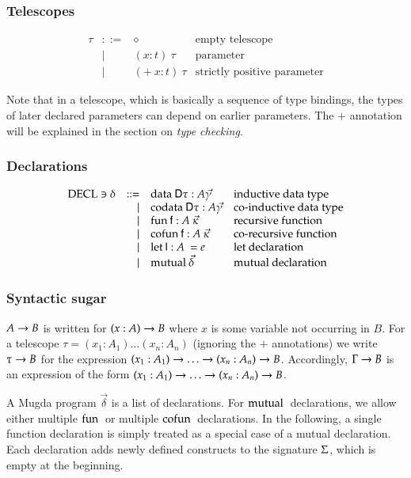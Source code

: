 \subsubsection{Telescopes}
\[
\begin{array}{lrll}
\tau & ::= & \diamond & \mbox{empty telescope}\\
& \mid & ( x : t ) \: \tau & \mbox{parameter}\\
& \mid & ( + \: x : t ) \: \tau & \mbox{strictly positive parameter}
\end{array}
\]

Note that in a telescope, which is basically a sequence of type bindings, the types of later declared parameters can depend on earlier parameters. The $+$ annotation will be explained in the section on \emph{type checking}. 

\subsubsection{Declarations}
\[
\begin{array}{lrll}
\operatorname{DECL} \ni \delta & ::= & \mathrm{data}\: \mathsf{D} \tau : A \vec{\gamma} & \mbox{inductive data type}\\ 
& \mid & \mathrm{codata}\: \mathsf{D} \tau : A \vec{\gamma} & \mbox{co-inductive data type} \\
& \mid & \mathrm{fun}\: \mathsf{f} : A \: \vec{\kappa} & \mbox{recursive function}\\
& \mid & \mathrm{cofun}\: \mathsf{f} : A \: \vec{\kappa} & \mbox{co-recursive function}\\ 
& \mid & \mathrm{let}\: \mathsf{l} : A \: = e & \mbox{let declaration}\\
& \mid & \mathrm{mutual}\: \vec{\delta} & \mbox{mutual declaration}
\end{array}
\]



\subsubsection{Syntactic sugar}
$A \rightarrow B$ is written for $( x : A ) \rightarrow{B}$ where $x$ is some variable not occurring in $B$.
For a telescope $\tau = (x_1 : A_1) \ldots (x_n : A_n)$ (ignoring the $+$ annotations) we write
$\tau \rightarrow B$ for the expression  $( x_1 : A_1 ) \rightarrow{\ldots \rightarrow( x_n : A_n ) \rightarrow{B}}$.
Accordingly, $\Gamma \rightarrow B$ is an expression of the form $( x_1 : A_1 ) \rightarrow{\ldots \rightarrow( x_n : A_n ) \rightarrow{B}}$.

A Mugda program $\vec{\delta}$ is a list of declarations.
For $\mathrm{mutual}\:$ declarations, we allow either multiple $\mathrm{fun}\:$ or multiple $\mathrm{cofun}\:$ declarations.
In the following, a single function declaration is simply treated as a special case of a mutual declaration.
Each declaration adds newly defined constructs to the signature $\Sigma$, which is empty at the beginning.

